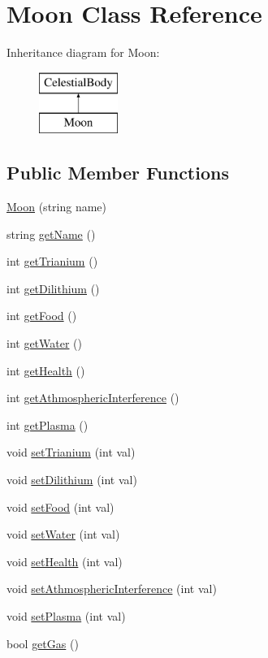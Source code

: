 \hypertarget{classMoon}{
\section{Moon Class Reference}
\label{d8/d6f/classMoon}
}
Inheritance diagram for Moon:\begin{figure}[H]
\begin{center}
\leavevmode
\includegraphics[height=2cm]{d8/d6f/classMoon}
\end{center}
\end{figure}
\subsection*{Public Member Functions}
\begin{DoxyCompactItemize}
\item 
\hyperlink{classMoon_a5215a61100839fba014a10816182c601}{Moon} (string name)
\item 
string \hyperlink{classMoon_a7015a95bbb104f0fc3b46ece7a427655}{getName} ()
\item 
int \hyperlink{classMoon_afa9d20396dcd4a5501fe1ee9c0a23397}{getTrianium} ()
\item 
int \hyperlink{classMoon_ac79186e5684da6bebfd9821ff655bc71}{getDilithium} ()
\item 
int \hyperlink{classMoon_a790c4ae16bde7df44f608c98a535afec}{getFood} ()
\item 
int \hyperlink{classMoon_a6d687ec0a5f6437b0af4615241afe94f}{getWater} ()
\item 
int \hyperlink{classMoon_a70626fe26dfa798f21791cc182a829f4}{getHealth} ()
\item 
int \hyperlink{classMoon_af15b50721bac099545c7a0be97d04483}{getAthmosphericInterference} ()
\item 
int \hyperlink{classMoon_acc0fef605a7fd18d16aff7e827e9bf9a}{getPlasma} ()
\item 
void \hyperlink{classMoon_a76c433c77c0efca8fd093630b1767f13}{setTrianium} (int val)
\item 
void \hyperlink{classMoon_ab73d920601c3f398cb23b2d78f816f49}{setDilithium} (int val)
\item 
void \hyperlink{classMoon_a525d52c5f9c8582d2e81dfc30f97dd1c}{setFood} (int val)
\item 
void \hyperlink{classMoon_a489d140b5ff38114cd0f5f15512a99d4}{setWater} (int val)
\item 
void \hyperlink{classMoon_ae6ba20c5d4f9b6ac33d35d2e31452089}{setHealth} (int val)
\item 
void \hyperlink{classMoon_a1088a8f3e7198b38d9ce498f9f6243a9}{setAthmosphericInterference} (int val)
\item 
void \hyperlink{classMoon_a3bff2a5c897c5c66b6e16b16077ba1cc}{setPlasma} (int val)
\item 
bool \hyperlink{classMoon_ad7881084092664bd2bd72a12552fb4a0}{getGas} ()
\end{DoxyCompactItemize}


